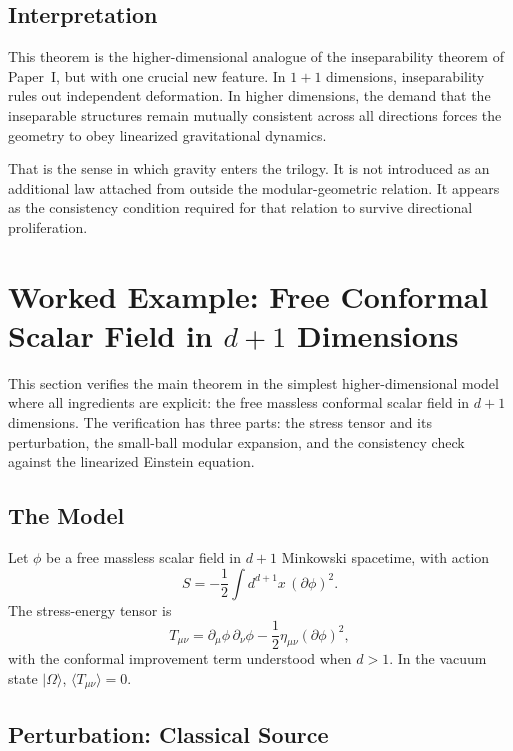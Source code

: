 \documentclass[12pt]{article}
\theoremstyle{definition}
\theoremstyle{remark}
\begin{document}
\subsection{Interpretation}\label{subsec:4.4}

This theorem is the higher-dimensional analogue of the inseparability theorem of Paper~I\cite{PaperI}, but with one crucial new feature. In \(1+1\) dimensions, inseparability rules out independent deformation. In higher dimensions, the demand that the inseparable structures remain mutually consistent across all directions forces the geometry to obey linearized gravitational dynamics.

That is the sense in which gravity enters the trilogy. It is not introduced as an additional law attached from outside the modular-geometric relation. It appears as the consistency condition required for that relation to survive directional proliferation.

\section{Worked Example: Free Conformal Scalar Field in \texorpdfstring{\(d+1\)}{d+1} Dimensions}\label{sec:5}

This section verifies the main theorem in the simplest higher-dimensional model where all ingredients are explicit: the free massless conformal scalar field in \(d+1\) dimensions. The verification has three parts: the stress tensor and its perturbation, the small-ball modular expansion, and the consistency check against the linearized Einstein equation.

\subsection{The Model}\label{subsec:5.1}

Let \(\phi\) be a free massless scalar field in \(d+1\) Minkowski spacetime, with action
\[
S = -\frac{1}{2}\int d^{d+1}x\, (\partial\phi)^2.
\]
The stress-energy tensor is
\[
T_{\mu\nu} = \partial_\mu\phi\,\partial_\nu\phi - \frac{1}{2}\eta_{\mu\nu}(\partial\phi)^2,
\]
with the conformal improvement term understood when \(d > 1\). In the vacuum state \(|\Omega\rangle\), \(\langle T_{\mu\nu}\rangle = 0\).

\subsection{Perturbation: Classical Source}\label{subsec:5.2}
\end{document}
